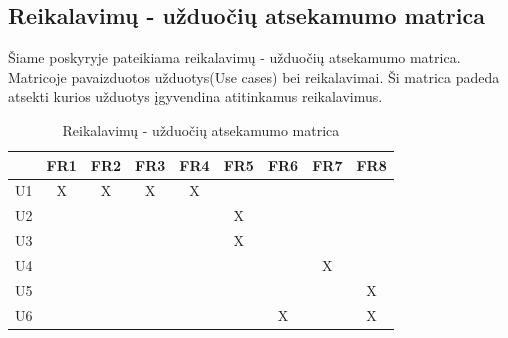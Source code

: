 \documentclass{VUMIFPSkursinis}
\begin{document}
\begin{enumerate}[label=\textbf{U\arabic*}.]
                \end{enumerate}
      
            \subsection{Reikalavimų - užduočių atsekamumo matrica}
            Šiame poskyryje pateikiama reikalavimų - užduočių atsekamumo matrica. Matricoje pavaizduotos užduotys(Use cases) bei reikalavimai. Ši matrica padeda atsekti kurios užduotys įgyvendina atitinkamus reikalavimus.
            \begin{table}[H]\footnotesize
                \centering
                \caption{Reikalavimų - užduočių atsekamumo matrica}
                {
                    \begin{tabular}{|c|c|c|c|c|c|c|c|c| }
                    \hline
                        & FR1 & FR2 & FR3 & FR4 & FR5 & FR6 & FR7 & FR8 \\ 
                    \hline
                     U1 & X   & X   & X   & X   &     &     &     &      \\  
                    \hline
                     U2 &     &     &     &     & X   &     &     &      \\ 
                    \hline
                     U3 &     &     &     &     & X   &     &     &      \\ 
                    \hline
                     U4 &     &     &     &     &     &     & X   &      \\ 
                    \hline
                     U5 &     &     &     &     &     &     &     & X    \\ 
                    \hline
                     U6 &     &     &     &     &     & X   &     & X    \\ 
                    \hline 
                    \end{tabular}
                }
            \end{table}
\end{document}
